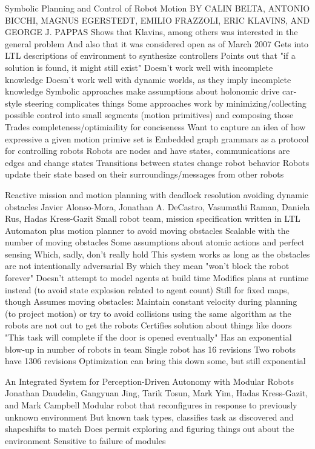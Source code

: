 Symbolic Planning and Control of Robot Motion
BY CALIN BELTA, ANTONIO BICCHI, MAGNUS EGERSTEDT, EMILIO FRAZZOLI, ERIC KLAVINS, AND GEORGE J. PAPPAS
	Shows that Klavins, among others was interested in the general problem
	And also that it was considered open as of March 2007
	Gets into LTL descriptions of environment to synthesize controllers
		Points out that "if a solution is found, it might still exist"
		Doesn't work well with incomplete knowledge
		Doesn't work well with dynamic worlds, as they imply incomplete knowledge
	Symbolic approaches make assumptions about holonomic drive
		car-style steering complicates things
	Some approaches work by minimizing/collecting possible control into small segments (motion primitives) and composing those
		Trades completeness/optimiaility for conciseness
		Want to capture an idea of how expressive a given motion primive set is
	Embedded graph grammars as a protocol for controlling robots
		Robots are nodes and have states, communications are edges and change states
		Transitions between states change robot behavior
		Robots update their state based on their surroundings/messages from other robots

Reactive mission and motion planning with deadlock resolution avoiding dynamic obstacles
Javier Alonso-Mora, Jonathan A. DeCastro, Vasumathi Raman, Daniela Rus, Hadas Kress-Gazit
	Small robot team, mission specification written in LTL
	Automaton plus motion planner to avoid moving obstacles
	Scalable with the number of moving obstacles
	Some assumptions about atomic actions and perfect sensing
		Which, sadly, don't really hold
	This system works as long as the obstacles are not intentionally adversarial
		By which they mean "won't block the robot forever"
	Doesn't attempt to model agents at build time
		Modifies plans at runtime instead (to avoid state explosion related to agent count)
	Still for fixed maps, though
	Assumes moving obstacles: 
		Maintain constant velocity during planning (to project motion)
		or try to avoid collisions using the same algorithm as the robots
		are not out to get the robots
	Certifies solution about things like doors
		"This task will complete if the door is opened eventually"
	Has an exponential blow-up in number of robots in team
		Single robot has 16 revisions
		Two robots have 1306 revisions
		Optimization can bring this down some, but still exponential

An Integrated System for Perception-Driven Autonomy with Modular Robots
Jonathan Daudelin, Gangyuan Jing, Tarik Tosun, Mark Yim, Hadas Kress-Gazit, and Mark Campbell
	Modular robot that reconfigures in response to previously unknown environment
		But known task types, classifies task as discovered and shapeshifts to match
	Does permit exploring and figuring things out about the environment
	Sensitive to failure of modules
	
